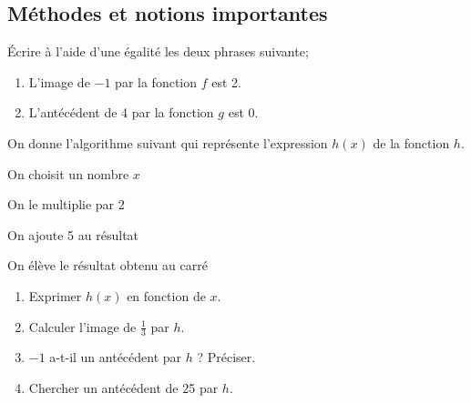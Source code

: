 \documentclass[openany]{book}
\begin{document}
\begin{seance}

\section{Méthodes et notions importantes}


\end{seance}



Écrire à l'aide d'une égalité les deux phrases suivante;
\begin{enumerate}
\item L'image de $-1$ par la fonction $f$ est 2.
\item L'antécédent de 4 par la fonction $g$ est 0.
\end{enumerate}



\begin{minipage}{0.5\linewidth}
On donne l'algorithme suivant qui représente l'expression $h(x)$ de la fonction $h$.

\begin{description}
\item On choisit un nombre $x$
\item On le multiplie par 2
\item On ajoute 5 au résultat
\item On élève le résultat obtenu au carré 
\end{description}
\end{minipage}
\begin{minipage}{0.5\linewidth}
\begin{enumerate}
\item Exprimer $h(x)$ en fonction de $x$.
\item Calculer l'image de $\frac{1}{3}$ par $h$.
\item $-1$ a-t-il un antécédent par $h$ ? Préciser.
\item Chercher un antécédent de 25 par $h$.
\end{enumerate}
\end{minipage}

\end{document}
